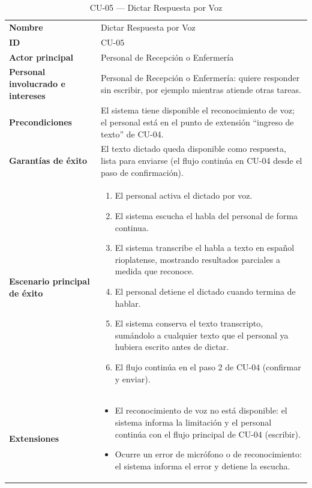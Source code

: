 \begin{longtable}{@{}>{\raggedright\arraybackslash}p{4.1cm} >{\raggedright\arraybackslash}p{\dimexpr\textwidth-4.1cm-2\tabcolsep\relax}@{}}
\caption{CU-05 --- Dictar Respuesta por Voz}\\
\toprule
\textbf{Nombre} & Dictar Respuesta por Voz \\
\textbf{ID} & CU-05 \\
\textbf{Actor principal} & Personal de Recepción o Enfermería \\
\textbf{Personal involucrado e intereses} &
Personal de Recepción o Enfermería: quiere responder sin escribir, por
ejemplo mientras atiende otras tareas. \\
\textbf{Precondiciones} &
El sistema tiene disponible el reconocimiento de voz; el personal está en
el punto de extensión ``ingreso de texto'' de CU-04. \\
\textbf{Garantías de éxito} &
El texto dictado queda disponible como respuesta, lista para enviarse
(el flujo continúa en CU-04 desde el paso de confirmación). \\
\textbf{Escenario principal de éxito} &
\begin{enumerate}[leftmargin=*, itemsep=2pt]
    \item El personal activa el dictado por voz.
    \item El sistema escucha el habla del personal de forma
    continua.
    \item El sistema transcribe el habla a texto en español rioplatense,
    mostrando resultados parciales a medida que reconoce.
    \item El personal detiene el dictado cuando termina de hablar.
    \item El sistema conserva el texto transcripto, sumándolo a cualquier
    texto que el personal ya hubiera escrito antes de dictar.
    \item El flujo continúa en el paso 2 de CU-04 (confirmar y enviar).
\end{enumerate} \\
\textbf{Extensiones} &
\begin{itemize}[leftmargin=*, itemsep=2pt]
    \item[1a.] El reconocimiento de voz no está disponible: el sistema
    informa la limitación y el personal continúa con el flujo
    principal de CU-04 (escribir).
    \item[2a.] Ocurre un error de micrófono o de reconocimiento: el
    sistema informa el error y detiene la escucha.
\end{itemize} \\

\end{longtable}
